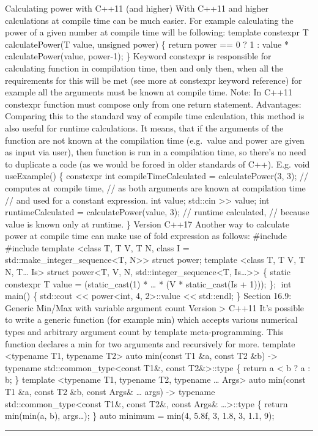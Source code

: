 Calculating power with C++11 (and higher) With C++11 and higher
calculations at compile time can be much easier. For example calculating
the power of a given number at compile time will be following: template
constexpr T calculatePower(T value, unsigned power) \{ return power == 0
? 1 : value * calculatePower(value, power-1); \} Keyword constexpr is
responsible for calculating function in compilation time, then and only
then, when all the requirements for this will be met (see more at
constexpr keyword reference) for example all the arguments must be known
at compile time. Note: In C++11 constexpr function must compose only
from one return statement. Advantages: Comparing this to the standard
way of compile time calculation, this method is also useful for runtime
calculations. It means, that if the arguments of the function are not
known at the compilation time (e.g.~value and power are given as input
via user), then function is run in a compilation time, so there's no
need to duplicate a code (as we would be forced in older standards of
C++). E.g. void useExample() \{ constexpr int compileTimeCalculated =
calculatePower(3, 3); // computes at compile time, // as both arguments
are known at compilation time // and used for a constant expression. int
value; std::cin \textgreater\textgreater{} value; int runtimeCalculated
= calculatePower(value, 3); // runtime calculated, // because value is
known only at runtime. \} Version C++17 Another way to calculate power
at compile time can make use of fold expression as follows: \#include
\#include template \textless class T, T V, T N, class I =
std::make\_integer\_sequence\textless T, N\textgreater\textgreater{}
struct power; template \textless class T, T V, T N, T\ldots{}
Is\textgreater{} struct power\textless T, V, N,
std::integer\_sequence\textless T, Is\ldots\textgreater\textgreater{} \{
static constexpr T value = (static\_cast(1) * \ldots{} * (V *
static\_cast(Is + 1))); \}; int main() \{ std::cout
\textless\textless{} power\textless int, 4, 2\textgreater::value
\textless\textless{} std::endl; \} Section 16.9: Generic Min/Max with
variable argument count Version \textgreater{} C++11 It's possible to
write a generic function (for example min) which accepts various
numerical types and arbitrary argument count by template
meta-programming. This function declares a min for two arguments and
recursively for more. template \textless typename T1, typename
T2\textgreater{} auto min(const T1 \&a, const T2 \&b) -\textgreater{}
typename std::common\_type\textless const T1\&, const
T2\&\textgreater::type \{ return a \textless{} b ? a : b; \} template
\textless typename T1, typename T2, typename \ldots{} Args\textgreater{}
auto min(const T1 \&a, const T2 \&b, const Args\& \ldots{} args)
-\textgreater{} typename std::common\_type\textless const T1\&, const
T2\&, const Args\& \ldots\textgreater::type \{ return min(min(a, b),
args\ldots); \} auto minimum = min(4, 5.8f, 3, 1.8, 3, 1.1, 9);

\begin{center}\rule{0.5\linewidth}{0.5pt}\end{center}
